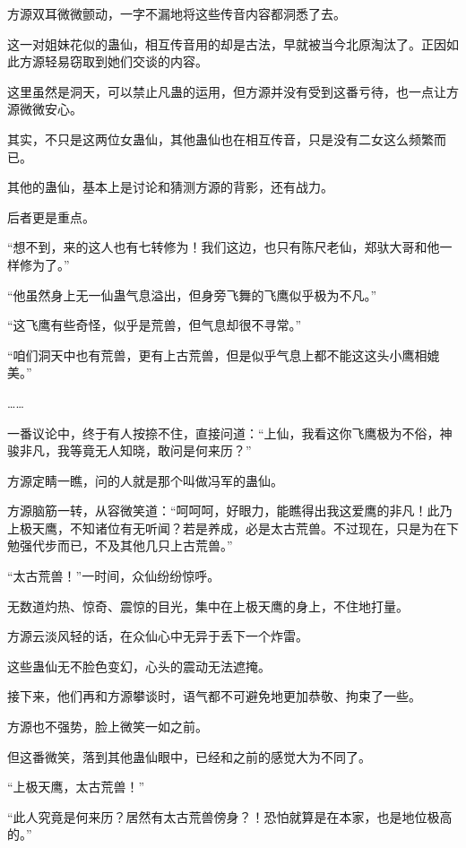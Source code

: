 \begin{this_body}
方源双耳微微颤动，一字不漏地将这些传音内容都洞悉了去。

这一对姐妹花似的蛊仙，相互传音用的却是古法，早就被当今北原淘汰了。正因如此方源轻易窃取到她们交谈的内容。

这里虽然是洞天，可以禁止凡蛊的运用，但方源并没有受到这番亏待，也一点让方源微微安心。

其实，不只是这两位女蛊仙，其他蛊仙也在相互传音，只是没有二女这么频繁而已。

其他的蛊仙，基本上是讨论和猜测方源的背影，还有战力。

后者更是重点。

“想不到，来的这人也有七转修为！我们这边，也只有陈尺老仙，郑驮大哥和他一样修为了。”

“他虽然身上无一仙蛊气息溢出，但身旁飞舞的飞鹰似乎极为不凡。”

“这飞鹰有些奇怪，似乎是荒兽，但气息却很不寻常。”

“咱们洞天中也有荒兽，更有上古荒兽，但是似乎气息上都不能这这头小鹰相媲美。”

……

一番议论中，终于有人按捺不住，直接问道：“上仙，我看这你飞鹰极为不俗，神骏非凡，我等竟无人知晓，敢问是何来历？”

方源定睛一瞧，问的人就是那个叫做冯军的蛊仙。

方源脑筋一转，从容微笑道：“呵呵呵，好眼力，能瞧得出我这爱鹰的非凡！此乃上极天鹰，不知诸位有无听闻？若是养成，必是太古荒兽。不过现在，只是为在下勉强代步而已，不及其他几只上古荒兽。”

“太古荒兽！”一时间，众仙纷纷惊呼。

无数道灼热、惊奇、震惊的目光，集中在上极天鹰的身上，不住地打量。

方源云淡风轻的话，在众仙心中无异于丢下一个炸雷。

这些蛊仙无不脸色变幻，心头的震动无法遮掩。

接下来，他们再和方源攀谈时，语气都不可避免地更加恭敬、拘束了一些。

方源也不强势，脸上微笑一如之前。

但这番微笑，落到其他蛊仙眼中，已经和之前的感觉大为不同了。

“上极天鹰，太古荒兽！”

“此人究竟是何来历？居然有太古荒兽傍身？！恐怕就算是在本家，也是地位极高的。”

\end{this_body}

